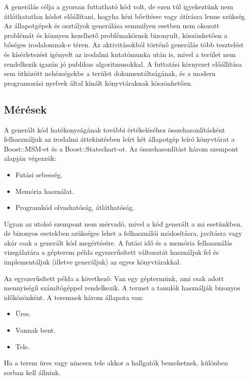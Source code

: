 \documentclass[a4paper,12pt]{report}
\begin{document}
A generálás célja a gyorsan futtatható kód volt, de ezen túl igyekeztünk nem átláthatatlan kódot előállítani, hogyha kézi bővítésre vagy átírásra lenne szükség. Az állapotgépek és osztályok generálása semmilyen esetben nem okozott problémát és könnyen kezelhető problémakörnek bizonyult, köszönhetően a bőséges irodalomnak-e téren. Az aktivitásokból történő generálás több tesztelést és kísérletezést igényelt az irodalmi kutatómunka után is, mivel a terület nem rendelkezik igazán jó publikus algoritmusokkal. A futtatási környezet előállítása sem ütközött nehézségekbe a terület dokumentáltságának, és a modern programozási nyelvek által kínált könyvtáraknak köszönhetően.

\subsection{Mérések}

A generált kód hatékonyságának további értékeléséhez összehasonlításként felhasználjuk az irodalmi áttekintésben leírt két állapotgép leíró könyvtárat a Boost::MSM-et és a Boost::Statechart-ot. Az összehasonlítást három szempont alapján végezzük:
\begin{itemize}
\item Futási sebesség.
\item Memória használat.
\item Programkód olvashatóság, átláthatóság.
\end{itemize}
Ugyan az utolsó szempont nem mérvadó, mivel a kód generált a mi esetünkben, de bizonyos esetekben szükséges lehet a felhasználói módosításra, javításra vagy akár csak a generált kód megértésére. A futási idő és a memória felhasználás vizsgálatára a gépterem %
példa egyszerűsített változatát használjuk fel és implementáljuk (illetve generáljuk) az egyes könyvtárakkal.

Az egyszerűsített példa a következő: Van egy géptermünk, ami csak adott mennyiségű számítógéppel rendelkezik. A termet a tanulók használják bizonyos időközönként. A teremnek három állapota van:
\begin{itemize}
\item Üres.
\item Vannak bent.
\item Tele.
\end{itemize} 
Ha a terem üres vagy nincsen tele akkor a hallgatók bemehetnek, különben sorban kell állniuk. 

\pagebreak
\end{document}
